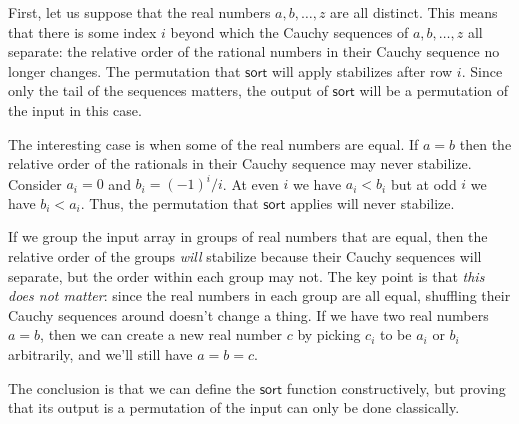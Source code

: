\documentclass[a4paper, 11pt]{article}
\newcommand{\sort}{\mathsf{sort}}
\begin{document}
First, let us suppose that the real numbers $a,b,\dots,z$ are all distinct. This means that there is some index $i$ beyond which the Cauchy sequences of $a,b,\dots,z$ all separate: the relative order of the rational numbers in their Cauchy sequence no longer changes. The permutation that $\sort$ will apply stabilizes after row $i$. Since only the tail of the sequences matters, the output of $\sort$ will be a permutation of the input in this case.

The interesting case is when some of the real numbers are equal. If $a = b$ then the relative order of the rationals in their Cauchy sequence may never stabilize. Consider $a_i = 0$ and $b_i = (-1)^i / i$. At even $i$ we have $a_i < b_i$ but at odd $i$ we have $b_i < a_i$. Thus, the permutation that $\sort$ applies will never stabilize.

If we group the input array in groups of real numbers that are equal, then the relative order of the groups \emph{will} stabilize because their Cauchy sequences will separate, but the order within each group may not. The key point is that \emph{this does not matter}: since the real numbers in each group are all equal, shuffling their Cauchy sequences around doesn't change a thing. If we have two real numbers $a=b$, then we can create a new real number $c$ by picking $c_i$ to be $a_i$ or $b_i$ arbitrarily, and we'll still have $a=b=c$.

The conclusion is that we can define the $\sort$ function constructively, but proving that its output is a permutation of the input can only be done classically.
\end{document}
